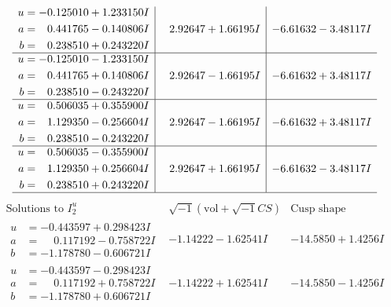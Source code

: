 \documentclass[1p]{elsarticle_modified}
\theoremstyle{definition}
\newcommand{\I}{\sqrt{-1}}
\begin{document}
$$\begin{array}{c|c|c}
\begin{aligned}
u &= -0.125010 + 1.233150 I \\
a &= \phantom{-}0.441765 - 0.140806 I \\
b &= \phantom{-}0.238510 + 0.243220 I\end{aligned}
 & \phantom{-}2.92647 + 1.66195 I & -6.61632 - 3.48117 I \\ \hline\begin{aligned}
u &= -0.125010 - 1.233150 I \\
a &= \phantom{-}0.441765 + 0.140806 I \\
b &= \phantom{-}0.238510 - 0.243220 I\end{aligned}
 & \phantom{-}2.92647 - 1.66195 I & -6.61632 + 3.48117 I \\ \hline\begin{aligned}
u &= \phantom{-}0.506035 + 0.355900 I \\
a &= \phantom{-}1.129350 - 0.256604 I \\
b &= \phantom{-}0.238510 - 0.243220 I\end{aligned}
 & \phantom{-}2.92647 - 1.66195 I & -6.61632 + 3.48117 I \\ \hline\begin{aligned}
u &= \phantom{-}0.506035 - 0.355900 I \\
a &= \phantom{-}1.129350 + 0.256604 I \\
b &= \phantom{-}0.238510 + 0.243220 I\end{aligned}
 & \phantom{-}2.92647 + 1.66195 I & -6.61632 - 3.48117 I\\
 \hline 
 \end{array}$$\newpage$$\begin{array}{c|c|c}  
\text{Solutions to }I^u_{2}& \I (\text{vol} + \sqrt{-1}CS) & \text{Cusp shape}\\
 \hline 
\begin{aligned}
u &= -0.443597 + 0.298423 I \\
a &= \phantom{-}0.117192 - 0.758722 I \\
b &= -1.178780 - 0.606721 I\end{aligned}
 & -1.14222 - 1.62541 I & -14.5850 + 1.4256 I \\ \hline\begin{aligned}
u &= -0.443597 - 0.298423 I \\
a &= \phantom{-}0.117192 + 0.758722 I \\
b &= -1.178780 + 0.606721 I\end{aligned}
 & -1.14222 + 1.62541 I & -14.5850 - 1.4256 I \\ \hline\begin{aligned}

\end{aligned}
\end{array}$$
\end{document}
